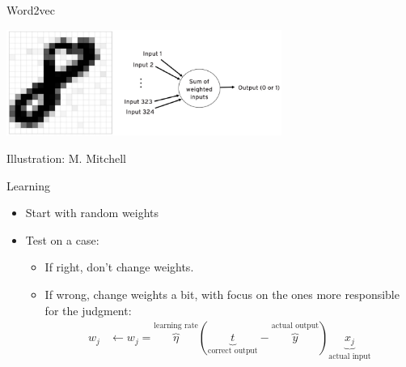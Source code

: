\documentclass[
  10pt,
  ignorenonframetext,
  x11names, dvipsnames, bibspacing, natbib, table]{beamer}
\begin{document}
\begin{frame}{Word2vec}
\protect\hypertarget{word2vec-2}{}
\begin{center}
 \includegraphics[width = 9cm]{images/perceptron1.png}
\end{center}

\vspace{-3mm}

\tiny \hfill \color{gray}Illustration: M. Mitchell \color{black}

\footnotesize

\begin{block}{Learning}
\begin{itemize}
\item Start with random weights
\item Test on a case:
\begin{itemize}
\item If right, don't change weights.
\item If wrong, change weights a bit, with focus on the ones more responsible for the judgment:
\begin{align*}
w_j & \leftarrow w_j = \overbrace{\eta}^{\text{learning rate}}(\underbrace{t}_{\text{correct output}} - \overbrace{y}^{\text{actual output}})\underbrace{x_j}_{\text{actual input}}
\end{align*}
\end{itemize}
\end{itemize}

\end{block}
\end{frame}
\end{document}
